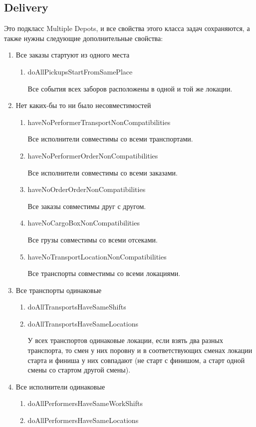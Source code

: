 \subsection{Delivery}

Это подкласс Multiple Depots, и все свойства этого класса задач сохраняются, а также нужны следующие дополнительные свойства:

\begin{enumerate}
	\item Все заказы стартуют из одного места
	\begin{enumerate}
		\item doAllPickupsStartFromSamePlace
	
	     Все события всех заборов расположены в одной и той же локации.
	\end{enumerate}

	\item Нет каких-бы то ни было несовместимостей
	\begin{enumerate}
		\item haveNoPerformerTransportNonCompatibilities
		
		Все исполнители совместимы со всеми транспортами.
		\item haveNoPerformerOrderNonCompatibilities
		
		Все исполнители совместимы со всеми заказами.
		\item haveNoOrderOrderNonCompatibilities	
		
		Все заказы совместимы друг с другом.
		\item haveNoCargoBoxNonCompatibilities
		
		Все грузы совместимы со всеми отсеками.
		\item haveNoTransportLocationNonCompatibilities
		
		Все транспорты совместимы со всеми локациями.
					
	\end{enumerate}
	\item Все транспорты одинаковые
	\begin{enumerate}
		\item doAllTransportsHaveSameShifts
		\item doAllTransportsHaveSameLocations
		
		У всех транспортов одинаковые локации, если взять два разных транспорта, то смен у них поровну и в соответствующих сменах локации старта и финиша у них совпадают (не старт с финишом, а старт одной смены со стартом другой смены).
	\end{enumerate}
	\item Все исполнители одинаковые
	\begin{enumerate}
		\item doAllPerformersHaveSameWorkShifts
	    \item doAllPerformersHaveSameLocations
	    

\end{enumerate}
\end{enumerate}
